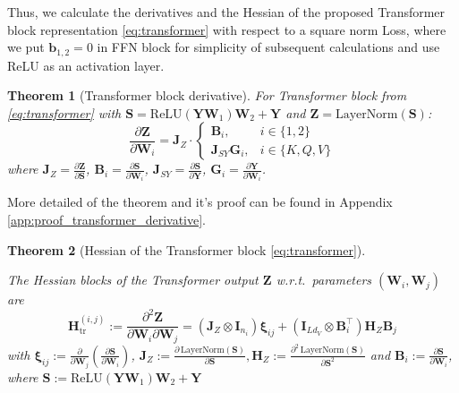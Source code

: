 \documentclass{article}
\newtheorem{theorem}{Theorem} %
\begin{document}
Thus, we calculate the derivatives and the Hessian of the proposed Transformer block representation \ref{eq:transformer} with respect to a square norm Loss, where we put $\mathbf{b}_{1,2} = 0$ in FFN block for simplicity of subsequent calculations and use ReLU as an activation layer.

\begin{theorem}[Transformer block derivative]\label{thm:transformer_derivative}
For Transformer block from \ref{eq:transformer} with \(\mathbf{S} = \text{ReLU}(\mathbf{Y}\mathbf{W}_1)\mathbf{W}_2 + \mathbf{Y}\) and \(\mathbf{Z} = \mathrm{LayerNorm}(\mathbf{S})\):
\[
\frac{\partial\mathbf{Z}}{\partial \mathbf{W}_i} = \mathbf{J}_Z \cdot 
\begin{cases}
\mathbf{B}_i, & i \in \{1,2\} \\
\mathbf{J}_{SY} \mathbf{G}_i, & i \in \{K,Q,V\}
\end{cases}
\]
where \(\mathbf{J}_Z = \frac{\partial\mathbf{Z}}{\partial\mathbf{S}}\), \(\mathbf{B}_i = \frac{\partial\mathbf{S}}{\partial\mathbf{W}_i}\), \(\mathbf{J}_{SY} = \frac{\partial\mathbf{S}}{\partial\mathbf{Y}}\), \(\mathbf{G}_i = \frac{\partial\mathbf{Y}}{\partial\mathbf{W}_i}\).
\end{theorem}

    


More detailed of the theorem and it's proof can be found in Appendix \ref{app:proof_transformer_derivative}.

\begin{theorem}[Hessian of the Transformer block \ref{eq:transformer}]\label{thm:transformer_hessian}

The Hessian blocks of the Transformer output $\mathbf{Z}$ w.r.t.\ parameters $(\mathbf{W}_i,\mathbf{W}_j)$ are
\begin{equation}\label{eq:block_hessian_transformer}
\boxed{
\;\mathbf{H}_{\mathrm{tr}}^{(i,j)} := \frac{\partial^2 \mathbf{Z}}{\partial \mathbf{W}_i \partial \mathbf{W}_j}
= \left( \mathbf{J}_Z \otimes \mathbf{I}_{n_i} \right) \boldsymbol{\xi}_{ij}
  + \left( \mathbf{I}_{L d_V} \otimes \mathbf{B}_i^\top \right) \mathbf{H}_Z \mathbf{B}_j \; } 
\end{equation}
with
$\boldsymbol{\xi}_{ij} := \frac{\partial}{\partial \mathbf{W}_j} \left( \frac{\partial \mathbf{S}}{\partial \mathbf{W}_i} \right) $, $\mathbf{J}_Z := \frac{\partial\,\mathrm{LayerNorm}(\mathbf{S})}{\partial \mathbf{S}},\mathbf{H}_Z := \frac{\partial^2\,\mathrm{LayerNorm}(\mathbf{S})}{\partial \mathbf{S}^2}$ and $\mathbf{B}_i := \frac{\partial \mathbf{S}}{\partial \mathbf{W}_i}$, where $\mathbf{S} := \text{ReLU}(\mathbf{Y}\mathbf{W}_1)\mathbf{W}_2 + \mathbf{Y}$

\end{theorem}
\end{document}
